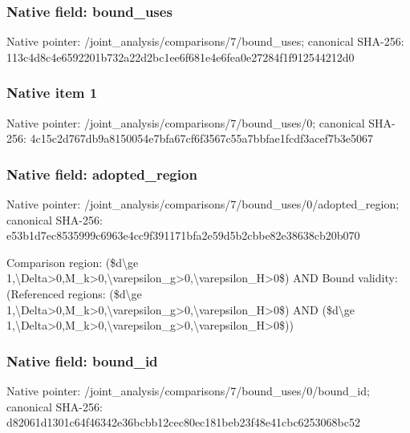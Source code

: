 \documentclass[10pt,a4paper]{article}
\begin{document}
\subsubsection{Native field: bound\_\allowbreak{}uses}
Native pointer: /joint\_\allowbreak{}analysis/comparisons/7/bound\_\allowbreak{}uses; canonical SHA-256: 113c4d8c4e6592201b732a22d2bc1ee6f681e4e6fea0e27284f1f912544212d0

\subsubsection{Native item 1}
Native pointer: /joint\_\allowbreak{}analysis/comparisons/7/bound\_\allowbreak{}uses/0; canonical SHA-256: 4c15c2d767db9a8150054e7bfa67cf6f3567c55a7bbfae1fcdf3acef7b3e5067

\subsubsection{Native field: adopted\_\allowbreak{}region}
Native pointer: /joint\_\allowbreak{}analysis/comparisons/7/bound\_\allowbreak{}uses/0/adopted\_\allowbreak{}region; canonical SHA-256: e53b1d7ec8535999c6963e4cc9f391171bfa2e59d5b2cbbe82e38638cb20b070

\begingroup\raggedright\sloppy Comparison region:\allowbreak{} (\$d\textbackslash{}ge 1,\allowbreak{}\textbackslash{}Delta>0,\allowbreak{}M\_\allowbreak{}k>0,\allowbreak{}\textbackslash{}varepsilon\_\allowbreak{}g>0,\allowbreak{}\textbackslash{}varepsilon\_\allowbreak{}H>0\$) AND Bound validity:\allowbreak{} (Referenced regions:\allowbreak{} (\$d\textbackslash{}ge 1,\allowbreak{}\textbackslash{}Delta>0,\allowbreak{}M\_\allowbreak{}k>0,\allowbreak{}\textbackslash{}varepsilon\_\allowbreak{}g>0,\allowbreak{}\textbackslash{}varepsilon\_\allowbreak{}H>0\$) AND (\$d\textbackslash{}ge 1,\allowbreak{}\textbackslash{}Delta>0,\allowbreak{}M\_\allowbreak{}k>0,\allowbreak{}\textbackslash{}varepsilon\_\allowbreak{}g>0,\allowbreak{}\textbackslash{}varepsilon\_\allowbreak{}H>0\$))\par\endgroup

\subsubsection{Native field: bound\_\allowbreak{}id}
Native pointer: /joint\_\allowbreak{}analysis/comparisons/7/bound\_\allowbreak{}uses/0/bound\_\allowbreak{}id; canonical SHA-256: d82061d1301c64f46342e36bcbb12cec80ec181beb23f48e41cbc6253068bc52
\end{document}
